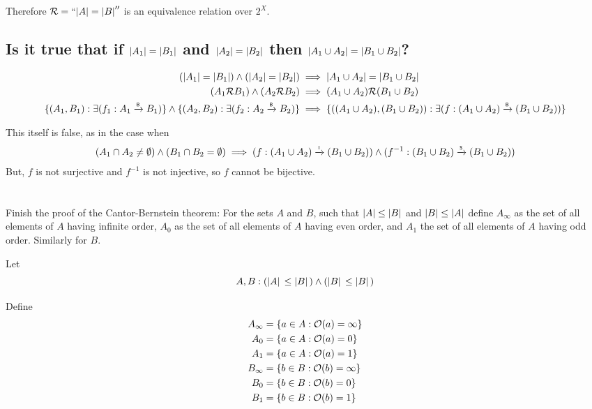 \documentclass[]{article}
\newcommand{\Rel}{\mathcal{R}}
\newcommand{\toI}{\xrightarrow{\textsf{\tiny I}}}
\newcommand{\toS}{\xrightarrow{\textsf{\tiny S}}}
\begin{document}
Therefore $\Rel = ``\abs{A} = \abs{B}''$ is an equivalence relation over $2^X$.

\newpage
\subsection{
	Is it true that if $\abs{A_1}=\abs{B_1}$ and $\abs{A_2}=\abs{B_2}$ 
	then $\abs{A_1 \cup A_2} = \abs{B_1 \cup B_2}$?
}
\begin{align*}
	(\abs{A_1} = \abs{B_1}) \land (\abs{A_2} = \abs{B_2})
		&\implies \abs{A_1 \cup A_2} = \abs{B_1 \cup B_2}\\
	(A_1 \Rel B_1) \land (A_2 \Rel B_2)
		&\implies (A_1 \cup A_2) \Rel (B_1 \cup B_2)\\
	\{(A_1,B_1) : \exists (f_1 : A_1 \xrightarrow{\textsf{\tiny B}} B_1)\}
		\land \{(A_2,B_2) : \exists (f_2 : A_2 \xrightarrow{\textsf{\tiny B}} B_2)\}
		&\implies \{((A_1 \cup A_2), (B_1 \cup B_2)) 
			: \exists (f : (A_1 \cup A_2) \xrightarrow{\textsf{\tiny B}} (B_1 \cup B_2))\}
\end{align*}

This itself is false, as in the case when 
\begin{align*}
	(A_1 \cap A_2 \neq \emptyset) \land (B_1 \cap B_2 = \emptyset)
	\implies (f : (A_1 \cup A_2) \toI (B_1 \cup B_2))
	\land (f^{-1} : (B_1 \cup B_2) \toS (B_1 \cup B_2))
\end{align*}
But, $f$ is not surjective and $f^{-1}$ is not injective, so $f$ cannot be bijective.

\newpage
\section{}
Finish the proof of the Cantor-Bernstein theorem:
For the sets $A$ and $B$, such that $\abs{A} \leq \abs{B}$ and $\abs{B} \leq \abs{A}$
define $A_\infty$ as the set of all elements of $A$ having infinite order,
$A_0$ as the set of all elements of $A$ having even order,
and $A_1$ the set of all elements of $A$ having odd order. Similarly for $B$.

Let
$$A,B : (\abs*{A} \leq \abs*{B}) \land (\abs*{B} \leq \abs*{B})$$

Define
\begin{align*}
	A_\infty &= \{a \in A : \order*{a} = \infty\}\\
	A_0 &= \{a \in A : \order*{a} = 0\}\\
	A_1 &= \{a \in A : \order*{a} = 1\}\\
	B_\infty &= \{b \in B : \order*{b} = \infty\}\\
	B_0 &= \{b \in B : \order*{b} = 0\}\\
	B_1 &= \{b \in B : \order*{b} = 1\}\\
\end{align*}
\end{document}
